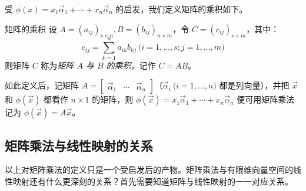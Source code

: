受 $\phi(x) = x_1 \vec \alpha_1 + \cdots + x_n \vec \alpha_n$ 的启发，我们定义矩阵的乘积如下。

\begin{definition}{矩阵的乘积}
	设 $A = (a_{ij})_{s \times n}, B = (b_{ij})_{n \times m}$，令 $C = (c_{ij})_{s \times m}$，其中：
	$$
	c_{ij} = \sum\limits_{k = 1}^n a_{ik} b_{kj} \pod{i = 1, \ldots, s; j = 1, \ldots, m}
	$$
	则矩阵 $C$ 称为\emph{矩阵 $A$ 与 $B$ 的乘积}，记作 $C = AB$。
\end{definition}

如此定义后，记矩阵 $A = \begin{bmatrix} \vec \alpha_1 & \cdots & \vec \alpha_n \end{bmatrix}$（$\vec \alpha_i \pod{i = 1, \ldots, n}$ 都是列向量），并把 $\vec x$ 和 $\phi(\vec x)$ 都看作 $n \times 1$ 的矩阵，则 $\phi(\vec x) = x_1 \vec \alpha_1 + \cdots + x_n \vec \alpha_n$ 便可用矩阵乘法记为 $\phi(\vec x) = A \vec x$。

\subsection{矩阵乘法与线性映射的关系}

以上对矩阵乘法的定义只是一个受启发后的产物。矩阵乘法与有限维向量空间的线性映射还有什么更深刻的关系？首先需要知道矩阵与线性映射的一一对应关系。